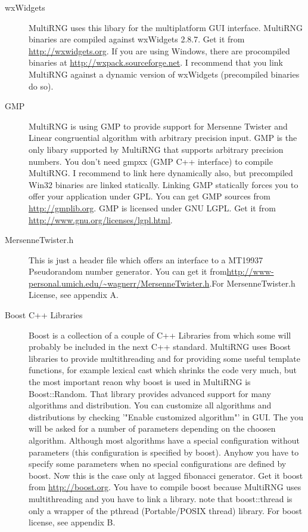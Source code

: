 \documentclass{scrartcl}
\begin{document}
\begin{description}
\item[wxWidgets]MultiRNG uses this libary for the multiplatform GUI interface. MultiRNG binaries are compiled against wxWidgets 2.8.7. Get it from \url{http://wxwidgets.org}. If you are using Windows, there are procompiled binaries at \url{http://wxpack.sourceforge.net}. I recommend that you link MultiRNG against a dynamic version of wxWidgets (precompiled binaries do so).
\item[GMP]MultiRNG is using GMP to provide support for Mersenne Twister and Linear congruential algorithm with arbitrary precision input. GMP is the only libary supported by MultiRNG that supports arbitrary precision numbers. You don't need gmpxx (GMP C++ interface) to compile MultiRNG. I recommend to link here dynamically also, but precompiled Win32 binaries are linked statically. Linking GMP statically forces you to offer your application under GPL. You can get GMP sources from \url{http://gmplib.org}. GMP is licensed under GNU LGPL. Get it from \url{http://www.gnu.org/licenses/lgpl.html}.
\item[MersenneTwister.h]This is just a header file which offers an interface to a MT19937 Pseudorandom number generator. You can get it from\newline \url{http://www-personal.umich.edu/~wagnerr/MersenneTwister.h}.\newline For MersenneTwister.h License, see appendix A.
\item[Boost C++ Libraries]Boost is a collection of a couple of C++ Libraries from which some will probably be included in the next C++ standard. MultiRNG uses Boost libraries to provide multithreading and for providing some useful template functions, for example lexical cast which shrinks the code very much, but the most important reaon why boost is used in MultiRNG is Boost::Random. That library provides advanced support for many algorithms and distribution. You can customize all algorithms and distributions by checking '"Enable customized algorithm"' in GUI. The you will be asked for a number of parameters depending on the choosen algorithm. Although most algorithms have a special configuration without parameters (this configuration is specified by boost). Anyhow you have to specify some parameters when no special configurations are defined by boost. Now this is the case only at lagged fibonacci generator. Get it boost from \url{http://boost.org}. You have to compile boost because MultiRNG uses multithreading and you have to link a library. note that boost::thread is only a wrapper of the pthread (Portable/POSIX thread) library. For boost license, see appendix B.
\end{description}
\end{document}
